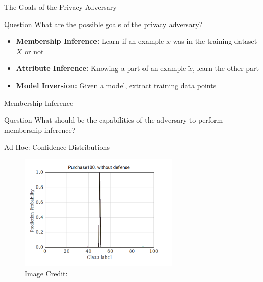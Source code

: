 \documentclass[10pt]{beamer}
\begin{document}
\begin{frame}{The Goals of the Privacy Adversary}
  \begin{alertblock}{Question}
    What are the possible goals of the privacy adversary?
  \end{alertblock}

  \begin{itemize}[<+-| alert@+>]
    \item \textbf{Membership Inference:} Learn if an example $x$ was in the training dataset $X$ or not
    \item \textbf{Attribute Inference:} Knowing a part of an example $\tilde x$, learn the other part
    \item \textbf{Model Inversion:} Given a model, extract training data points
  \end{itemize}

  \pause

\end{frame}


\begin{frame}{Membership Inference}
  \begin{alertblock}{Question}
    What should be the capabilities of the adversary to perform membership inference?
  \end{alertblock}

  \pause
\end{frame}


\begin{frame}{Ad-Hoc: Confidence Distributions}
  \begin{figure}
    \includegraphics[width=3in]{confidences.png} \\
    Image Credit: \cite{NasrSH18}
  \end{figure}
\end{frame}
\end{document}
